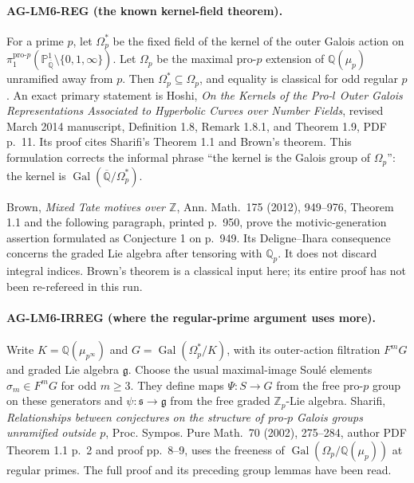 \paragraph{AG-LM6-REG (the known kernel-field theorem).}
For a prime $p$, let $\Omega_p^*$ be the fixed field of the kernel
of the outer Galois action on
$\pi_1^{\mathrm{pro}\text{-}p}
(\mathbb P^1_{\overline{\mathbb Q}}\setminus\{0,1,\infty\})$.
Let $\Omega_p$ be the maximal pro-$p$ extension of
$\mathbb Q(\mu_p)$ unramified away from $p$. Then
$\Omega_p^*\subseteq\Omega_p$, and equality is classical for odd
regular $p$. An exact primary statement is Hoshi,
\emph{On the Kernels of the Pro-$l$ Outer Galois Representations
Associated to Hyperbolic Curves over Number Fields}, revised March
2014 manuscript, Definition 1.8, Remark 1.8.1, and Theorem 1.9,
PDF p.~11. Its proof cites Sharifi's Theorem 1.1 and Brown's theorem.
This formulation corrects the informal phrase ``the kernel is the
Galois group of $\Omega_p$'': the kernel is
$\operatorname{Gal}(\overline{\mathbb Q}/\Omega_p^*)$.

Brown, \emph{Mixed Tate motives over $\mathbb Z$}, Ann. Math.~175
(2012), 949--976, Theorem 1.1 and the following paragraph, printed
p.~950, prove the motivic-generation assertion formulated as
Conjecture 1 on p.~949. Its Deligne--Ihara consequence concerns the
graded Lie algebra after tensoring with $\mathbb Q_p$. It does not
discard integral indices. Brown's theorem is a classical input here;
its entire proof has not been re-refereed in this run.

\paragraph{AG-LM6-IRREG (where the regular-prime argument uses more).}
Write $K=\mathbb Q(\mu_{p^\infty})$ and
$G=\operatorname{Gal}(\Omega_p^*/K)$, with its outer-action
filtration $F^mG$ and graded Lie algebra $\mathfrak g$.
Choose the usual maximal-image Soulé elements $\sigma_m\in F^mG$
for odd $m\ge3$. They define maps $\Psi:S\to G$ from the free
pro-$p$ group on these generators and
$\psi:\mathfrak s\to\mathfrak g$ from the free graded
$\mathbb Z_p$-Lie algebra. Sharifi,
\emph{Relationships between conjectures on the structure of pro-$p$
Galois groups unramified outside $p$}, Proc. Sympos. Pure Math.~70
(2002), 275--284, author PDF Theorem 1.1 p.~2 and proof pp.~8--9,
uses the freeness of
$\operatorname{Gal}(\Omega_p/\mathbb Q(\mu_p))$ at regular primes.
The full proof and its preceding group lemmas have been read.

